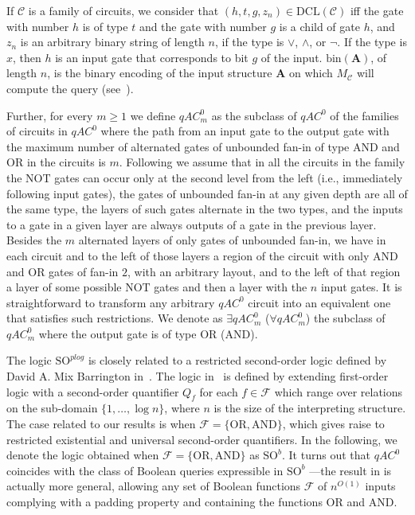 \documentclass{article}
\begin{document}
If $\mathcal{C}$ is a family of circuits, we consider that $(h,t,g,z_n) \in \mathrm{DCL(\mathcal{C})}$ iff the gate with number $h$ is of type $t$ and the gate with number $g$ is a child of gate $h$, and $z_n$ is an arbitrary binary string of length $n$, if the type is $\vee$, $\wedge$, or $\neg$. If the type is $x$, then $h$ is an input gate that corresponds to bit $g$ of the input. $\mathrm{bin}(\mathbf{A})$, of length $n$,  is the binary encoding of the input structure $\mathbf{A}$ on which $M_{\mathcal{C}}$ will compute the query (see~\cite{Immerman99}). 

  Further, for every $m \geq 1$ we define $qAC^0_{m}$ as the subclass of $qAC^0$ of the families of circuits in $qAC^0$ where the path from  an input gate  to the output gate  with the maximum number of alternated gates of unbounded fan-in of type $\mathrm{AND}$ and $\mathrm{OR}$ in the circuits is $m$.
Following \cite{barrington:jcss1990} we assume that in all the circuits in the family the $\mathrm{NOT}$  gates can occur only at the second level from the left (i.e., immediately following input gates), the gates of unbounded fan-in at any given depth are all of the same type, the layers of such gates alternate in the two types, and the inputs to a gate in a given layer are always outputs of a gate in the previous layer.
Besides the $m$ alternated layers of only gates of unbounded fan-in, we have in each circuit and to the left of those layers a region of the circuit with only $\mathrm{AND}$ and $\mathrm{OR}$ gates of fan-in $2$, with an arbitrary layout, and to the left of that region a layer of some possible $\mathrm{NOT}$ gates and then a layer with the $n$ input gates.
It is straightforward to transform any arbitrary $qAC^0$ circuit into an equivalent one that satisfies such restrictions.
We denote as $\exists qAC^0_{m}$ ($\forall qAC^0_{m}$) the subclass of $qAC^0_{m}$ where the output gate is of type $\mathrm{OR}$ ($\mathrm{AND}$).

The logic $\mathrm{SO}^{\mathit{plog}}$ is closely related to a restricted second-order logic defined by David A. Mix Barrington in~\cite{Barr92}. The logic in~\cite{Barr92} is defined by extending first-order logic with a second-order quantifier $Q_{f}$ for each $f \in \mathcal{F}$ which range over relations on the sub-domain $\{1, \ldots, \log n\}$, where $n$ is the size of the interpreting structure. The case related to our results is when $\mathcal{F} = \{\mathrm{OR}, \mathrm{AND}\}$, which gives raise to restricted existential and universal second-order quantifiers. In the following, we denote the logic obtained when $\mathcal{F} = \{\mathrm{OR}, \mathrm{AND}\}$ as $\mathrm{SO}^b$. It turns out that $qAC^0$ coincides with the class of Boolean queries expressible in $\mathrm{SO}^{b}$ ---the result in \cite{Barr92} is actually more general, allowing any set of Boolean functions  $\mathcal{F}$ of $n^{{O}(1)}$ inputs complying with a padding property and containing the functions $\mathrm{OR}$ and $\mathrm{AND}$.
\end{document}
